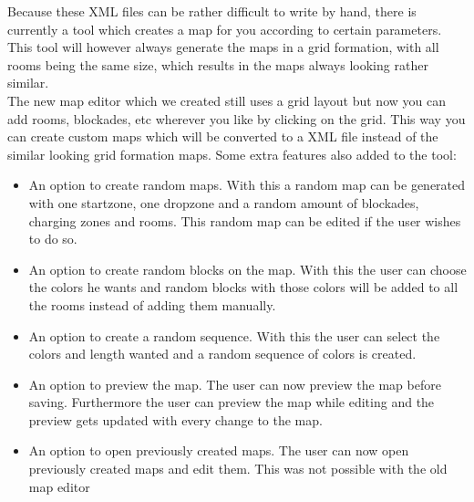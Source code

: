 Because these XML files can be rather difficult to write by hand, there is currently a tool which creates a map for you according to certain parameters. This tool will however always generate the maps in a grid formation, with all rooms being the same size, which results in the maps always looking rather similar. \\
The new map editor which we created still uses a grid layout but now you can add rooms, blockades, etc wherever you like by clicking on the grid. This way you can create custom maps which will be converted to a XML file instead of the similar looking grid formation maps. 
Some extra features also added to the tool:
\begin{itemize}
\item An option to create random maps. With this a random map can be generated with one startzone, one dropzone and a random amount of blockades, charging zones and rooms. This random map can be edited if the user wishes to do so.
\item An option to create random blocks on the map. With this the user can choose the colors he wants and random blocks with those colors will be added to all the rooms instead of adding them manually.
\item An option to create a random sequence. With this the user can select the colors and length wanted and a random sequence of colors is created.
\item An option to preview the map. The user can now preview the map before saving. Furthermore the user can preview the map while editing and the preview gets updated with every change to the map.
\item An option to open previously created maps. The user can now open previously created maps and edit them. This was not possible with the old map editor
\end{itemize}
